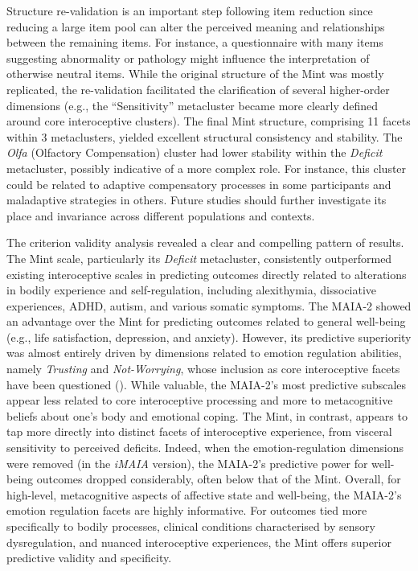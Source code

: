 \documentclass[
  jou,
  floatsintext,
  longtable,
  nolmodern,
  notxfonts,
  notimes,
  colorlinks=true,linkcolor=blue,citecolor=blue,urlcolor=blue]{apa7}
\begin{document}
Structure re-validation is an important step following item reduction
since reducing a large item pool can alter the perceived meaning and
relationships between the remaining items. For instance, a questionnaire
with many items suggesting abnormality or pathology might influence the
interpretation of otherwise neutral items. While the original structure
of the Mint was mostly replicated, the re-validation facilitated the
clarification of several higher-order dimensions (e.g., the
``Sensitivity'' metacluster became more clearly defined around core
interoceptive clusters). The final Mint structure, comprising 11 facets
within 3 metaclusters, yielded excellent structural consistency and
stability. The \emph{Olfa} (Olfactory Compensation) cluster had lower
stability within the \emph{Deficit} metacluster, possibly indicative of
a more complex role. For instance, this cluster could be related to
adaptive compensatory processes in some participants and maladaptive
strategies in others. Future studies should further investigate its
place and invariance across different populations and contexts.

The criterion validity analysis revealed a clear and compelling pattern
of results. The Mint scale, particularly its \emph{Deficit} metacluster,
consistently outperformed existing interoceptive scales in predicting
outcomes directly related to alterations in bodily experience and
self-regulation, including alexithymia, dissociative experiences, ADHD,
autism, and various somatic symptoms. The MAIA-2 showed an advantage
over the Mint for predicting outcomes related to general well-being
(e.g., life satisfaction, depression, and anxiety). However, its
predictive superiority was almost entirely driven by dimensions related
to emotion regulation abilities, namely \emph{Trusting} and
\emph{Not-Worrying}, whose inclusion as core interoceptive facets have
been questioned (). While valuable, the MAIA-2's most predictive subscales appear
less related to core interoceptive processing and more to metacognitive
beliefs about one's body and emotional coping. The Mint, in contrast,
appears to tap more directly into distinct facets of interoceptive
experience, from visceral sensitivity to perceived deficits. Indeed,
when the emotion-regulation dimensions were removed (in the \emph{iMAIA}
version), the MAIA-2's predictive power for well-being outcomes dropped
considerably, often below that of the Mint. Overall, for high-level,
metacognitive aspects of affective state and well-being, the MAIA-2's
emotion regulation facets are highly informative. For outcomes tied more
specifically to bodily processes, clinical conditions characterised by
sensory dysregulation, and nuanced interoceptive experiences, the Mint
offers superior predictive validity and specificity.
\end{document}
